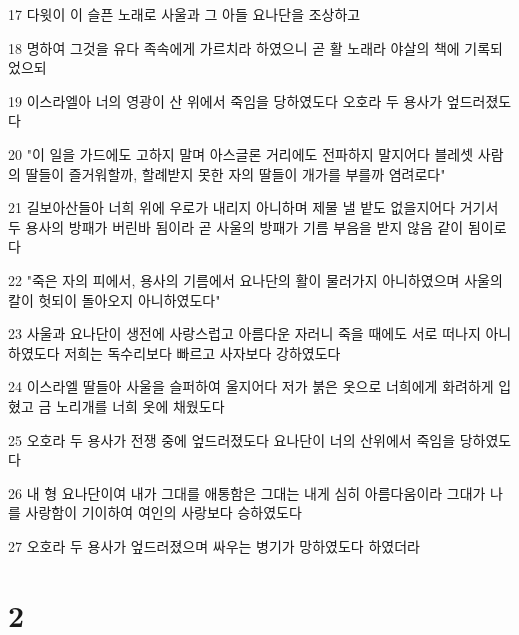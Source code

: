 \par 17 다윗이 이 슬픈 노래로 사울과 그 아들 요나단을 조상하고
\par 18 명하여 그것을 유다 족속에게 가르치라 하였으니 곧 활 노래라 야살의 책에 기록되었으되
\par 19 이스라엘아 너의 영광이 산 위에서 죽임을 당하였도다 오호라 두 용사가 엎드러졌도다
\par 20 "이 일을 가드에도 고하지 말며 아스글론 거리에도 전파하지 말지어다 블레셋 사람의 딸들이 즐거워할까, 할례받지 못한 자의 딸들이 개가를 부를까 염려로다"
\par 21 길보아산들아 너희 위에 우로가 내리지 아니하며 제물 낼 밭도 없을지어다 거기서 두 용사의 방패가 버린바 됨이라 곧 사울의 방패가 기름 부음을 받지 않음 같이 됨이로다
\par 22 "죽은 자의 피에서, 용사의 기름에서 요나단의 활이 물러가지 아니하였으며 사울의 칼이 헛되이 돌아오지 아니하였도다"
\par 23 사울과 요나단이 생전에 사랑스럽고 아름다운 자러니 죽을 때에도 서로 떠나지 아니하였도다 저희는 독수리보다 빠르고 사자보다 강하였도다
\par 24 이스라엘 딸들아 사울을 슬퍼하여 울지어다 저가 붉은 옷으로 너희에게 화려하게 입혔고 금 노리개를 너희 옷에 채웠도다
\par 25 오호라 두 용사가 전쟁 중에 엎드러졌도다 요나단이 너의 산위에서 죽임을 당하였도다
\par 26 내 형 요나단이여 내가 그대를 애통함은 그대는 내게 심히 아름다움이라 그대가 나를 사랑함이 기이하여 여인의 사랑보다 승하였도다
\par 27 오호라 두 용사가 엎드러졌으며 싸우는 병기가 망하였도다 하였더라

\chapter{2}

